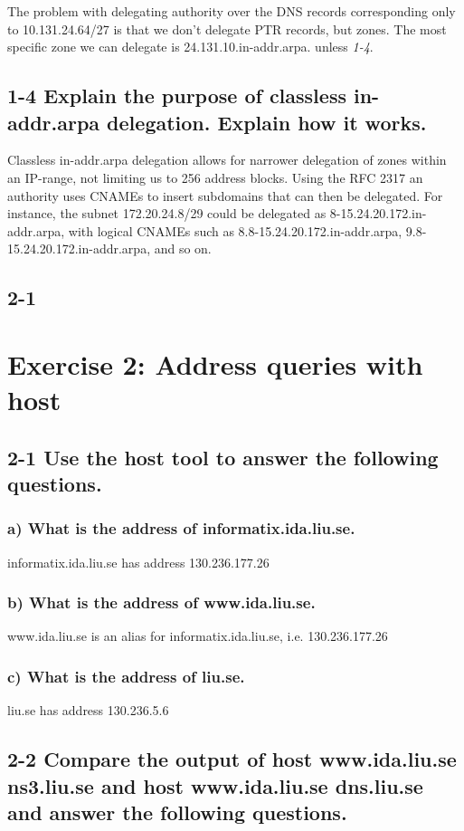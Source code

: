 The problem with delegating authority over the DNS records corresponding only to 10.131.24.64/27 is that we don't delegate PTR records, but zones. The most specific zone we can delegate is 24.131.10.in-addr.arpa. unless \emph{1-4}.

\subsection{1-4 Explain the purpose of classless in-addr.arpa delegation. Explain how it works.}
Classless in-addr.arpa delegation allows for narrower delegation of zones within an IP-range, not limiting us to 256 address blocks. Using the RFC 2317 an authority uses CNAMEs to insert subdomains that can then be delegated. For instance, the subnet 172.20.24.8/29 could be delegated as 8-15.24.20.172.in-addr.arpa, with logical CNAMEs such as 8.8-15.24.20.172.in-addr.arpa, 9.8-15.24.20.172.in-addr.arpa, and so on.

\subsection{2-1}
\section{Exercise 2: Address queries with host}
\subsection{2-1 Use the host tool to answer the following questions.}
\subsubsection{a) What is the address of informatix.ida.liu.se.}
informatix.ida.liu.se has address 130.236.177.26

\subsubsection{b) What is the address of www.ida.liu.se.}
www.ida.liu.se is an alias for informatix.ida.liu.se, i.e. 130.236.177.26

\subsubsection{c) What is the address of liu.se.}
liu.se has address 130.236.5.6

\subsection{2-2 Compare the output of host www.ida.liu.se ns3.liu.se and host www.ida.liu.se dns.liu.se and answer the following questions.}

